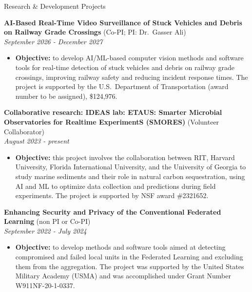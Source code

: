 \documentclass[10pt]{resume} %
\begin{document}
\begin{rSection}{Research \& Development Projects}

{\bf AI-Based Real-Time Video Surveillance of Stuck Vehicles and Debris on Railway Grade Crossings} (Co-PI; PI: Dr.\ Gasser Ali) \\
\hspace*{\fill} {\em September 2026 - December 2027}
\vspace{-0.3cm}
\begin{itemize}
\itemsep-0.5em
\item \textbf{Objective:} to develop AI/ML-based computer vision methods and software tools for real-time detection of stuck vehicles and debris on railway grade crossings, improving railway safety and reducing incident response times. The project is supported by the U.S.\ Department of Transportation (award number to be assigned), \$124,976.
\end{itemize}

{\bf Collaborative research: IDEAS lab: ETAUS: Smarter Microbial Observatories for Realtime ExperimentS (SMORES)} (Volunteer Collaborator) \\
\hspace*{\fill} {\em August 2023 - present}
\vspace{-0.3cm}
\begin{itemize}
\itemsep-0.5em
\item \textbf{Objective:} this project involves the collaboration between RIT, Harvard University, Florida International University, and the University of Georgia to study marine sediments and their role in natural carbon sequestration, using AI and ML to optimize data collection and predictions during field experiments. The project is supported by NSF award \#2321652.
\end{itemize}

{\bf Enhancing Security and Privacy of the Conventional Federated Learning} (non PI or Co-PI) \\
\hspace*{\fill} {\em September 2022 - July 2024}
\vspace{-0.3cm}
\begin{itemize}
\itemsep-0.5em
\item \textbf{Objective:} to develop methods and software tools aimed at detecting compromised and failed local units in the Federated Learning and excluding them from the aggregation. %
The project was supported by the United States Military Academy (USMA) and was accomplished under Grant Number W911NF-20-1-0337.
\end{itemize}


\end{rSection}
\end{document}
